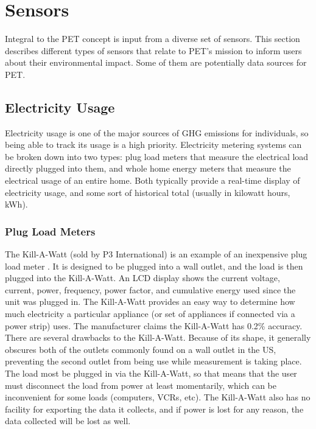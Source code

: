 \section{Sensors}
\label{sensor-section}

Integral to the PET concept is input from a diverse set of sensors. This section describes different types of sensors that relate to PET's mission to inform users about their environmental impact. Some of them are potentially data sources for PET.

\subsection{Electricity Usage}

Electricity usage is one of the major sources of GHG emissions for individuals, so being able to track its usage is a high priority. Electricity metering systems can be broken down into two types: plug load meters that measure the electrical load directly plugged into them, and whole home energy meters that measure the electrical usage of an entire home. Both typically provide a real-time display of electricity usage, and some sort of historical total (usually in kilowatt hours, kWh).

\subsubsection{Plug Load Meters}
\label{plug-load-meters}

The Kill-A-Watt (sold by P3 International) is an example of an inexpensive plug load meter \cite{kill-a-watt}. It is designed to be plugged into a wall outlet, and the load is then plugged into the Kill-A-Watt. An LCD display shows the current voltage, current, power, frequency, power factor, and cumulative energy used since the unit was plugged in. The Kill-A-Watt provides an easy way to determine how much electricity a particular appliance (or set of appliances if connected via a power strip) uses. The manufacturer claims the Kill-A-Watt has 0.2\% accuracy. There are several drawbacks to the Kill-A-Watt. Because of its shape, it generally obscures both of the outlets commonly found on a wall outlet in the US, preventing the second outlet from being use while measurement is taking place. The load most be plugged in via the Kill-A-Watt, so that means that the user must disconnect the load from power at least momentarily, which can be inconvenient for some loads (computers, VCRs, etc). The Kill-A-Watt also has no facility for exporting the data it collects, and if power is lost for any reason, the data collected will be lost as well.

